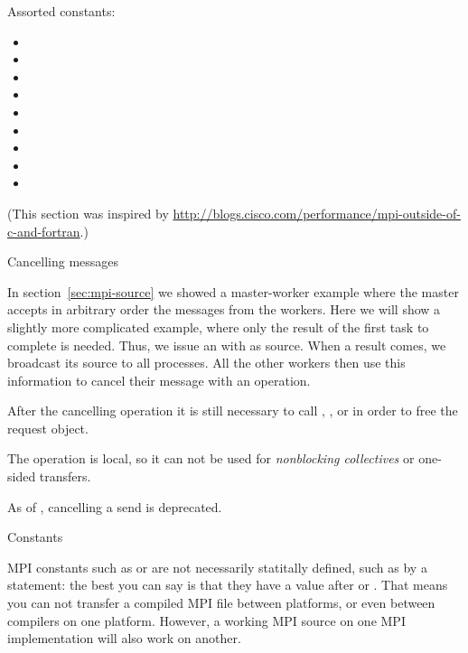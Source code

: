 Assorted constants:
\begin{itemize}
\item {}
\item {}
\item {}
\item {}
\item {}
\item {}
\item {}
\item {}
\item {}
\end{itemize}

(This section was inspired by
\url{http://blogs.cisco.com/performance/mpi-outside-of-c-and-fortran}.)


 {Cancelling messages}

In section~\ref{sec:mpi-source} we showed a master-worker example where the 
master accepts in arbitrary order the messages from the workers.
Here we will show a slightly
more complicated example, where only the result of the first task to
complete is needed. Thus, we issue an 
with  as source.  When a result comes, we
broadcast its source to all processes.  All the other workers then use
this information to cancel their message with
an  operation.
%

After the cancelling operation it is still necessary to call
, , or
 in order to free the request object.

The  operation is local, so it can not be
used for
\emph{nonblocking collectives}
or one-sided transfers.

\begin{remark}
  As of , cancelling a send is deprecated.
\end{remark}

 {Constants}

MPI constants such as  or  are not
necessarily statitally defined, such as by a  statement:
the best you can say is that they have a value after
 or .
That means you can not transfer a compiled MPI file between
platforms, or even between compilers on one platform.
However, a working MPI source on one MPI implementation
will also work on another.

